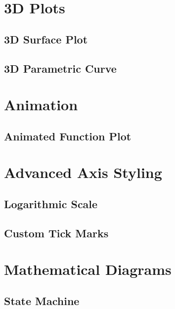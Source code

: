 \documentclass{beamer}
\begin{document}
\section{3D Plots}
\subsection{3D Surface Plot}

\subsection{3D Parametric Curve}



\section{Animation}
\subsection{Animated Function Plot}



\section{Advanced Axis Styling}
\subsection{Logarithmic Scale}

\subsection{Custom Tick Marks}



\section{Mathematical Diagrams}
\subsection{State Machine}

\end{document}
